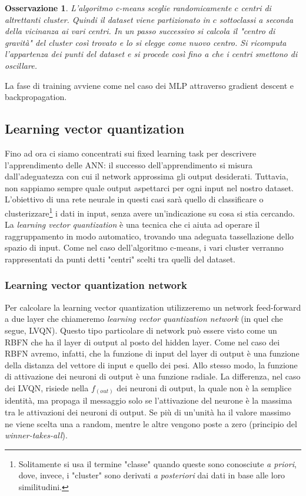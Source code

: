 \documentclass[10pt,a4paper]{article}
\newtheorem{remark}{Osservazione}
\begin{document}
\begin{remark}
\emph{L'algoritmo c-means sceglie randomicamente $c$ centri di altrettanti cluster. Quindi il dataset viene partizionato in $c$ sottoclassi a seconda della vicinanza ai vari centri. In un passo successivo si calcola il "centro di gravità" del cluster così trovato e lo si elegge come nuovo centro. Si ricomputa l'appartenza dei punti del dataset e si procede così fino a che i centri smettono di oscillare.}
\end{remark}

La fase di training avviene come nel caso dei MLP attraverso gradient descent e backpropagation. 

\subsection{Learning vector quantization}

Fino ad ora ci siamo concentrati sui fixed learning task per descrivere l'apprendimento delle ANN: il successo dell'apprendimento si misura dall'adeguatezza con cui il network approssima gli output desiderati. Tuttavia, non sappiamo sempre quale output aspettarci per ogni input nel nostro dataset. L'obiettivo di una rete neurale in questi casi sarà quello di classificare o clusterizzare\footnote{Solitamente si usa il termine "classe" quando queste sono conosciute \emph{a priori}, dove, invece, i "cluster" sono derivati \emph{a posteriori} dai dati in base alle loro similitudini.} i dati in input, senza avere un'indicazione su cosa si stia cercando. La \emph{learning vector quantization} è una tecnica che ci aiuta ad operare il raggruppamento in modo automatico, trovando una adeguata tassellazione dello spazio di input. Come nel caso dell'algoritmo c-means, i vari cluster verranno rappresentati da punti detti "centri" scelti tra quelli del dataset.

\subsubsection{Learning vector quantization network}

Per calcolare la learning vector quantization utilizzeremo un network feed-forward a due layer che chiameremo \emph{learning vector quantization network} (in quel che segue, LVQN). Questo tipo particolare di network può essere visto come un RBFN che ha il layer di output al posto del hidden layer. Come nel caso dei RBFN avremo, infatti, che la funzione di input del layer di output è una funzione della distanza del vettore di input e quello dei pesi. Allo stesso modo, la funzione di attivazione dei neuroni di output è una funzione radiale. La differenza, nel caso dei LVQN, risiede nella $f_{(out)}$ dei neuroni di output, la quale non è la semplice identità, ma propaga il messaggio solo se l'attivazione del neurone è la massima tra le attivazioni dei neuroni di output. Se più di un'unità ha il valore massimo ne viene scelta una a random, mentre le altre vengono poste a zero (principio del \emph{winner-takes-all}). 
\end{document}
